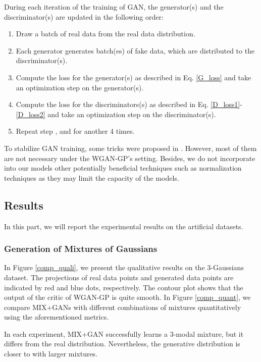 \documentclass[conference]{IEEEtran}
\begin{document}
During each iteration of the training of GAN, the generator(s) and the discriminator(s) are updated in the following order:
\begin{enumerate}
	\item Draw a batch of real data from the real data distribution.
	\item Each generator generates  batch(es) of fake data, which are distributed to the  discriminator(s).
	\item Compute the loss for the generator(s) as described in Eq. \ref{G_loss} and take an optimization step on the generator(s).
	\item Compute the loss for the discriminators(s) as described in Eq. \ref{D_loss1}-\ref{D_loss2} and take an optimization step on the discriminator(s).
	\item Repeat step ,  and  for another 4 times.
\end{enumerate}

To stabilize GAN training, some tricks were proposed in \cite{GANtips}. However, most of them are not necessary under the WGAN-GP's setting. Besides, we do not incorporate into our models other potentially beneficial techniques such as normalization techniques \cite{batchnorm,layernormalization,weightnormalization,spectralnorm} as they may limit the capacity of the models.

\subsection{Results}
In this part, we will report the experimental results on the artificial datasets.

\subsubsection{Generation of Mixtures of Gaussians}

In Figure \ref{comp_quali}, we present the qualitative results on the 3-Gaussians dataset. The projections of real data points and generated data points are indicated by red and blue dots, respectively. The contour plot shows that the output of the critic of WGAN-GP is quite smooth. In Figure \ref{comp_quant}, we compare MIX+GANs with different combinations of mixtures quantitatively using the aforementioned metrics. 

In each experiment, MIX+GAN successfully learns a 3-modal mixture, but it differs from the real distribution. Nevertheless, the generative distribution  is closer to  with larger mixtures. 
\end{document}
